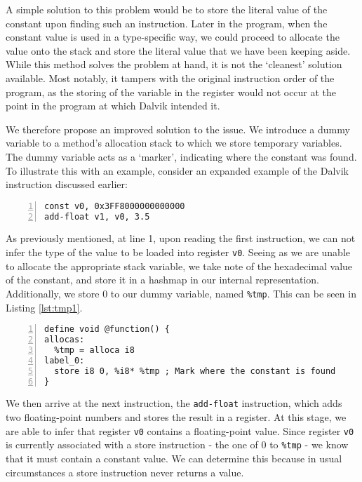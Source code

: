 A simple solution to this problem would be to store the literal value of the constant upon finding such an instruction. Later in the program, when the constant value is used in a type-specific way, we could proceed to allocate the value onto the stack and store the literal value that we have been keeping aside. While this method solves the problem at hand, it is not the `cleanest' solution available. Most notably, it tampers with the original instruction order of the program, as the storing of the variable in the register would not occur at the point in the program at which Dalvik intended it.

We therefore propose an improved solution to the issue. We introduce a dummy variable to a method's allocation stack to which we store temporary variables. The dummy variable acts as a `marker', indicating where the constant was found. To illustrate this with an example, consider an expanded example of the Dalvik instruction discussed earlier:

\begin{lstlisting}[frame=single, numbers=left, numberstyle=\tiny]
const v0, 0x3FF8000000000000
add-float v1, v0, 3.5
\end{lstlisting}

As previously mentioned, at line 1, upon reading the first instruction, we can not infer the type of the value to be loaded into register \verb|v0|. Seeing as we are unable to allocate the appropriate stack variable, we take note of the hexadecimal value of the constant, and store it in a hashmap in our internal representation. Additionally, we store 0 to our dummy variable, named \verb|%tmp|. This can be seen in Listing \ref{lst:tmp1}.


\begin{lstlisting}[frame=single, numbers=left, numberstyle=\tiny, caption={LLVM bytecode handling type inference}, label=lst:tmp1]
define void @function() {
allocas:
  %tmp = alloca i8
label_0:
  store i8 0, %i8* %tmp ; Mark where the constant is found
}
\end{lstlisting}

We then arrive at the next instruction, the \verb|add-float| instruction, which adds two floating-point numbers and stores the result in a register. At this stage, we are able to infer that register \verb|v0| contains a floating-point value. Since register \verb|v0| is currently associated with a store instruction - the one of 0 to \verb|%tmp| - we know that it must contain a constant value. We can determine this because in usual circumstances a store instruction never returns a value.

